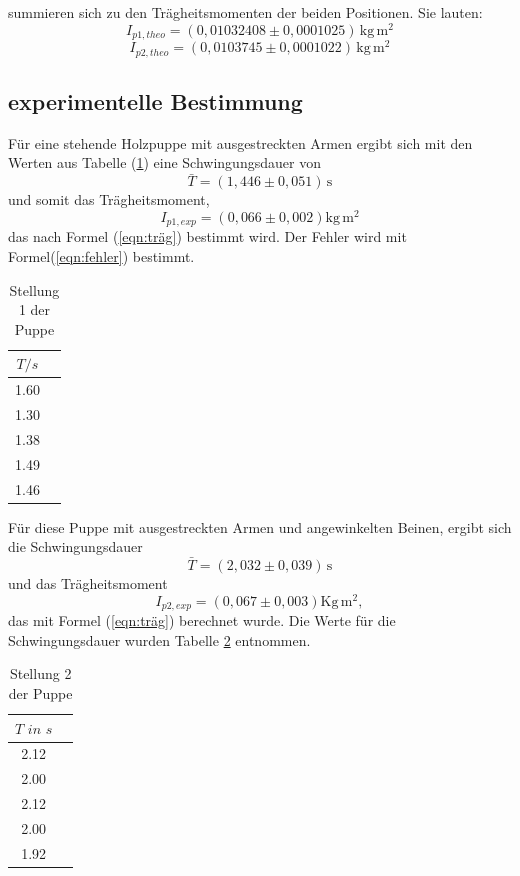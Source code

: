 summieren sich zu den Trägheitsmomenten der beiden Positionen.
Sie lauten:
\begin{equation*}
  I_{p1,theo} = (0,01032408 \pm 0,0001025) \, \mathrm{kg \, m^2}
\end{equation*}
\begin{equation*}
  I_{p2,theo} = (0,0103745 \pm 0,0001022 ) \, \mathrm{kg \, m^2}
\end{equation*}

\subsection{experimentelle Bestimmung}
Für eine stehende Holzpuppe mit ausgestreckten Armen ergibt sich mit den
Werten aus Tabelle (\ref{tab:4}) eine Schwingungsdauer von
\begin{equation*}
\bar{T}= (1,446 \pm 0,051) \, \mathrm{s}
\end{equation*}
und somit das Trägheitsmoment,
\begin{equation*}
  I_{p1,exp} = (0,066 \pm 0,002) \mathrm{kg \, m^2}
\end{equation*}
 das nach Formel (\ref{eqn:träg}) bestimmt wird.
 Der Fehler wird mit Formel(\ref{eqn:fehler}) bestimmt.

 \begin{table}[H]
   \centering
   \caption{Stellung 1 der Puppe}
   \label{tab:4}
   \begin{tabular}{c c}
     \toprule
      $T/s$ \\
     \midrule
       1.60\\
      1.30\\
      1.38\\
      1.49\\
      1.46\\
     \bottomrule
   \end{tabular}
 \end{table}

Für diese Puppe mit ausgestreckten Armen und angewinkelten Beinen,
ergibt sich die Schwingungsdauer
\begin{equation*}
\bar{T}= (2,032 \pm 0,039) \, \mathrm{s}
\end{equation*}
und das Trägheitsmoment
\begin{equation*}
  I_{p2,exp}= (0,067 \pm 0,003) \mathrm{Kg \, m^2} ,
\end{equation*}
das mit Formel (\ref{eqn:träg}) berechnet wurde.
Die Werte für die Schwingungsdauer wurden Tabelle \ref{tab:5} entnommen.

\begin{table}
  \centering
  \caption{Stellung 2 der Puppe}
  \label{tab:5}
  \begin{tabular}{c c}
    \toprule
    $T\, \, in \, \,s$ \\
    \midrule
     2.12\\
     2.00\\
     2.12\\
     2.00\\
     1.92\\
    \bottomrule
  \end{tabular}
\end{table}
